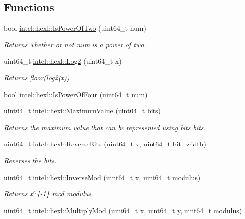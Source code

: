 \subsection*{Functions}
\begin{DoxyCompactItemize}
\item 
bool \hyperlink{namespaceintel_1_1hexl_ada0fe74afb4384b54728cba8ec3f69cd}{intel\+::hexl\+::\+Is\+Power\+Of\+Two} (uint64\+\_\+t num)
\begin{DoxyCompactList}\small\item\em Returns whether or not num is a power of two. \end{DoxyCompactList}\item 
uint64\+\_\+t \hyperlink{namespaceintel_1_1hexl_a066a83a4b122279313279a58cf440004}{intel\+::hexl\+::\+Log2} (uint64\+\_\+t x)
\begin{DoxyCompactList}\small\item\em Returns floor(log2(x)) \end{DoxyCompactList}\item 
bool \hyperlink{namespaceintel_1_1hexl_a74a77227ebbd892a0cff5089f3d89010}{intel\+::hexl\+::\+Is\+Power\+Of\+Four} (uint64\+\_\+t num)
\item 
uint64\+\_\+t \hyperlink{namespaceintel_1_1hexl_a9975ccaf5ec051c07ff4e3fef5c1fefb}{intel\+::hexl\+::\+Maximum\+Value} (uint64\+\_\+t bits)
\begin{DoxyCompactList}\small\item\em Returns the maximum value that can be represented using {\ttfamily bits} bits. \end{DoxyCompactList}\item 
uint64\+\_\+t \hyperlink{namespaceintel_1_1hexl_aa48183a39af615227d5b14c0fdb46105}{intel\+::hexl\+::\+Reverse\+Bits} (uint64\+\_\+t x, uint64\+\_\+t bit\+\_\+width)
\begin{DoxyCompactList}\small\item\em Reverses the bits. \end{DoxyCompactList}\item 
uint64\+\_\+t \hyperlink{namespaceintel_1_1hexl_ac949027d43c64d65400c93a148d349c6}{intel\+::hexl\+::\+Inverse\+Mod} (uint64\+\_\+t x, uint64\+\_\+t modulus)
\begin{DoxyCompactList}\small\item\em Returns x$^\wedge$\{-\/1\} mod modulus. \end{DoxyCompactList}\item 
uint64\+\_\+t \hyperlink{namespaceintel_1_1hexl_a838d9c2d540f99b349546461dee63252}{intel\+::hexl\+::\+Multiply\+Mod} (uint64\+\_\+t x, uint64\+\_\+t y, uint64\+\_\+t modulus)

\end{DoxyCompactItemize}
